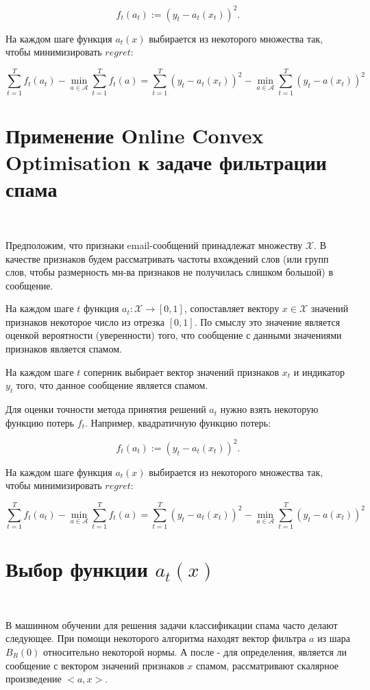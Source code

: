 \documentclass[12pt]{article}
\theoremstyle{definition}
\begin{document}
$$f_t(a_t) := (y_t-a_t(x_t))^2.$$

На каждом шаге функция $a_t(x)$ выбирается из некоторого множества так, чтобы минимизировать $regret$:

$$\sum\limits_{t=1}^T f_t(a_t) - \min\limits_{a \in \mathcal{A}} \sum\limits_{t=1}^T f_t(a) = \sum\limits_{t=1}^T (y_t-a_t(x_t))^2 - \min\limits_{a \in \mathcal{A}} \sum\limits_{t=1}^T (y_t-a(x_t))^2$$


\section*{Применение Online Convex Optimisation к задаче фильтрации спама}
$ $

Предположим, что признаки email-сообщений принадлежат множеству $\mathcal{X}$. В качестве признаков будем рассматривать частоты вхождений слов (или групп слов, чтобы размерность мн-ва признаков не получилась слишком большой) в сообщение.

На каждом шаге $t$ функция $a_t : \mathcal{X} \rightarrow [0, 1]$, сопоставляет вектору $x \in \mathcal{X}$ значений признаков некоторое число из отрезка $[0, 1]$. По смыслу это значение является оценкой вероятности (уверенности) того, что сообщение с данными значениями признаков является спамом.

На каждом шаге $t$ соперник выбирает вектор значений признаков $x_t$ и индикатор $y_t$ того, что данное сообщение является спамом.

Для оценки точности метода принятия решений $a_t$ нужно взять некоторую функцию потерь $f_t$. Например, квадратичную функцию потерь:

$$f_t(a_t) := (y_t-a_t(x_t))^2.$$

На каждом шаге функция $a_t(x)$ выбирается из некоторого множества так, чтобы минимизировать $regret$:

$$\sum\limits_{t=1}^T f_t(a_t) - \min\limits_{a \in \mathcal{A}} \sum\limits_{t=1}^T f_t(a) = \sum\limits_{t=1}^T (y_t-a_t(x_t))^2 - \min\limits_{a \in \mathcal{A}} \sum\limits_{t=1}^T (y_t-a(x_t))^2$$

\section*{Выбор функции $a_t(x)$}
$ $


В машинном обучении для решения задачи классификации спама часто делают следующее. При помощи некоторого алгоритма находят вектор фильтра $a$ из шара $B_R(0)$ относительно некоторой нормы. А после - для определения, является ли сообщение с вектором значений признаков $x$ спамом, рассматривают скалярное произведение $<a, x>$.
\end{document}
